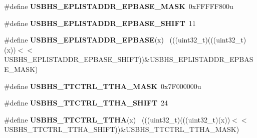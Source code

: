 \begin{DoxyCompactItemize}
\item 
\hypertarget{group___u_s_b_h_s___register___masks_ga4341eaeaebc3ea85cb262e80a2bc5518}{}\#define {\bfseries U\+S\+B\+H\+S\+\_\+\+E\+P\+L\+I\+S\+T\+A\+D\+D\+R\+\_\+\+E\+P\+B\+A\+S\+E\+\_\+\+M\+A\+S\+K}~0x\+F\+F\+F\+F\+F800u\label{group___u_s_b_h_s___register___masks_ga4341eaeaebc3ea85cb262e80a2bc5518}

\item 
\hypertarget{group___u_s_b_h_s___register___masks_ga41d471176519680214b6aaeb39b8beb7}{}\#define {\bfseries U\+S\+B\+H\+S\+\_\+\+E\+P\+L\+I\+S\+T\+A\+D\+D\+R\+\_\+\+E\+P\+B\+A\+S\+E\+\_\+\+S\+H\+I\+F\+T}~11\label{group___u_s_b_h_s___register___masks_ga41d471176519680214b6aaeb39b8beb7}

\item 
\hypertarget{group___u_s_b_h_s___register___masks_ga6c11960ef456c85ea94f05628d64651b}{}\#define {\bfseries U\+S\+B\+H\+S\+\_\+\+E\+P\+L\+I\+S\+T\+A\+D\+D\+R\+\_\+\+E\+P\+B\+A\+S\+E}(x)                          ~(((uint32\+\_\+t)(((uint32\+\_\+t)(x))$<$$<$U\+S\+B\+H\+S\+\_\+\+E\+P\+L\+I\+S\+T\+A\+D\+D\+R\+\_\+\+E\+P\+B\+A\+S\+E\+\_\+\+S\+H\+I\+F\+T))\&U\+S\+B\+H\+S\+\_\+\+E\+P\+L\+I\+S\+T\+A\+D\+D\+R\+\_\+\+E\+P\+B\+A\+S\+E\+\_\+\+M\+A\+S\+K)\label{group___u_s_b_h_s___register___masks_ga6c11960ef456c85ea94f05628d64651b}

\item 
\hypertarget{group___u_s_b_h_s___register___masks_gab48403b8b343423af436ed151cb7daa8}{}\#define {\bfseries U\+S\+B\+H\+S\+\_\+\+T\+T\+C\+T\+R\+L\+\_\+\+T\+T\+H\+A\+\_\+\+M\+A\+S\+K}~0x7\+F000000u\label{group___u_s_b_h_s___register___masks_gab48403b8b343423af436ed151cb7daa8}

\item 
\hypertarget{group___u_s_b_h_s___register___masks_ga86040a0931166feff1c41294a721f0f9}{}\#define {\bfseries U\+S\+B\+H\+S\+\_\+\+T\+T\+C\+T\+R\+L\+\_\+\+T\+T\+H\+A\+\_\+\+S\+H\+I\+F\+T}~24\label{group___u_s_b_h_s___register___masks_ga86040a0931166feff1c41294a721f0f9}

\item 
\hypertarget{group___u_s_b_h_s___register___masks_ga5aa64cc1a409b1fd63eecc797cbdc9f9}{}\#define {\bfseries U\+S\+B\+H\+S\+\_\+\+T\+T\+C\+T\+R\+L\+\_\+\+T\+T\+H\+A}(x)                                      ~(((uint32\+\_\+t)(((uint32\+\_\+t)(x))$<$$<$U\+S\+B\+H\+S\+\_\+\+T\+T\+C\+T\+R\+L\+\_\+\+T\+T\+H\+A\+\_\+\+S\+H\+I\+F\+T))\&U\+S\+B\+H\+S\+\_\+\+T\+T\+C\+T\+R\+L\+\_\+\+T\+T\+H\+A\+\_\+\+M\+A\+S\+K)\label{group___u_s_b_h_s___register___masks_ga5aa64cc1a409b1fd63eecc797cbdc9f9}


\end{DoxyCompactItemize}
